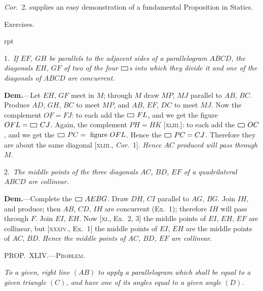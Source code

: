 \documentclass[oneside]{book}
\newcounter{wrapwidth}
\newcommand\pgram{
	\setlength{\unitlength}{1pt}
	\begin{picture}(11,8)(0,0)
	\linethickness{0.5pt}
	\put(1,0){\line(1,0){9}}
	\put(1,0){\line(0,1){5}}
	\put(1,5){\line(1,0){9}}
	\put(10,0){\line(0,1){5}}
	\end{picture}}
\newcommand\mypropl[2]{
\bigskip\Needspace*{4\baselineskip}\begin{center}\textsc{#1}\end{center}
\hspace{\parindent}\emph{#2}\par\medskip
}
\newcommand\exhead[1]{
\Needspace*{5\baselineskip}\begin{center}
\textsf{#1}
\end{center}
}
\newcommand\imgflow[3]{
\setcounter{wrapwidth}{#1}

\begin{wrapfigure}[#2]{r}{\value{wrapwidth}pt}
\begin{center}
\vspace{-0.3in}

\end{center}
\end{wrapfigure}
}
\newcommand\imgcent[2]{
\begin{center}

\end{center}
}
\begin{document}
\begin{footnotesize}
\textit{Cor.}~2. supplies an easy demonstration of a fundamental Proposition
in Statics.
\par\end{footnotesize}



\exhead{Exercises.}


\imgflow{170}{13}{f064}

\begin{footnotesize}
1.~\emph{If $EF$, $GH$ be parallels to the adjacent sides of a parallelogram
$ABCD$, the diagonals
$EH$, $GF$ of two of
the four $\pgram$s into which
they divide it and one of
the diagonals of $ABCD$
are concurrent.}

\textbf{Dem.}---Let $EH$, $GF$
meet in $M$; through $M$
draw $MP$, $MJ$ parallel to
$AB$, $BC$. Produce $AD$,
$GH$, $BC$ to meet $MP$,
and $AB$, $EF$, $DC$ to meet
$MJ$. Now the complement $OF = FJ$: to each add the $\pgram~FL$,
and we get the figure $OFL = \pgram~CJ$. Again, the complement
$PH=HK$ [\textsc{xliii}.]: to each add the $\pgram~OC$, and we get the $\pgram~PC
=\text{\ figure } OFL$. Hence the $\pgram~PC = CJ$. 
Therefore they are
about the same diagonal [\textsc{xliii}., \textit{Cor}.~1]. \emph{Hence $AC$ produced
will pass through $M$.}

2.~\emph{The middle points of the three diagonals $AC$, $BD$, $EF$ of
a quadrilateral $ABCD$ are
collinear.}


\imgcent{158}{f065}

\textbf{Dem.}---Complete the
$\pgram~AEBG$. Draw $DH$, $CI$
parallel to $AG$, $BG$. Join
$IH$, and produce; then $AB$,
$CD$, $IH$ are concurrent
(Ex.~1); therefore $IH$ will
pass through $F$. Join $EI$,
$EH$. Now [\textsc{xi}., Ex.~2, 3]
the middle points of $EI$,
$EH$, $EF$ are collinear, but
[\textsc{xxxiv}., Ex.~1] the middle
points of $EI$, $EH$ are the
middle points of $AC$, $BD$.
\emph{Hence the middle points of $AC$, $BD$, $EF$ are collinear.}
\par\end{footnotesize}



\mypropl{PROP\@.~XLIV\@.---Problem.}{To a given, right line $(AB)$ to apply a parallelogram
which shall be equal to a given triangle $(C)$, and have one
of its angles equal to a given angle $(D)$.}


\imgcent{240}{f066}
\end{document}
